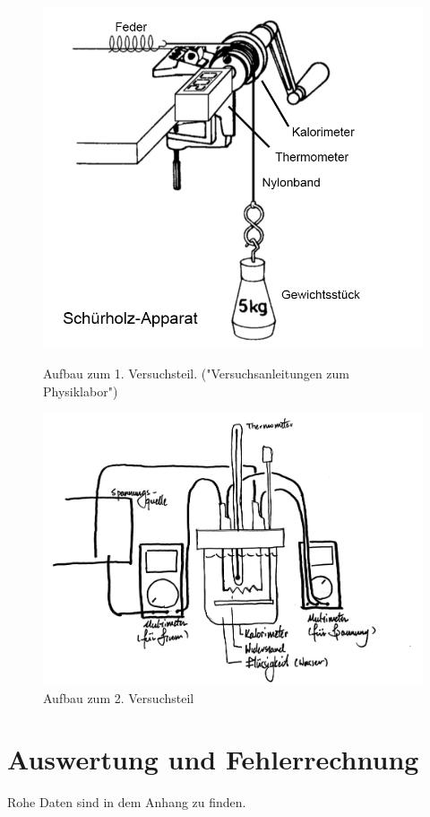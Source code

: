 \documentclass[11pt,a4paper]{article} %
\begin{document}
\begin{figure}
	\centering
	\includegraphics[scale=0.5]{fig1}
	\caption{Aufbau zum 1. Versuchsteil. ("Versuchsanleitungen zum Physiklabor")}
	
	\includegraphics[scale=0.10]{fig2}
	\caption{Aufbau zum 2. Versuchsteil}
\end{figure}
\newpage

\section{Auswertung und Fehlerrechnung}
Rohe Daten sind in dem Anhang zu finden. 
\end{document}

